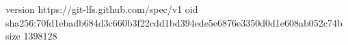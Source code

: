 version https://git-lfs.github.com/spec/v1
oid sha256:70fd1ebadb684d3c660b3f22cdd1bd394ede5e6876e3350d0d1e608ab052c74b
size 1398128
